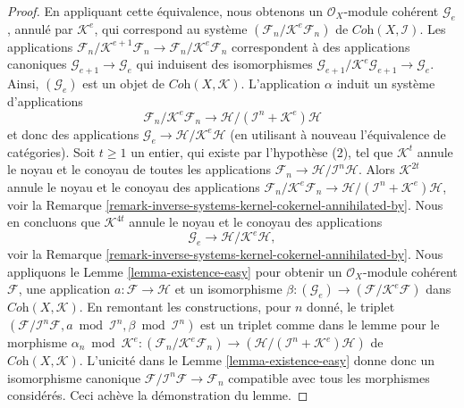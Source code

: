 \begin{proof}
\medskip\noindent
En appliquant cette équivalence, nous obtenons un
$\mathcal{O}_X$-module cohérent $\mathcal{G}_e$, annulé par
$\mathcal{K}^e$, qui correspond au système
$(\mathcal{F}_n/\mathcal{K}^e\mathcal{F}_n)$ de
$\textit{Coh}(X, \mathcal{I})$. Les applications
$\mathcal{F}_n/\mathcal{K}^{e + 1}\mathcal{F}_n \to
\mathcal{F}_n/\mathcal{K}^e\mathcal{F}_n$ correspondent à des applications
canoniques $\mathcal{G}_{e + 1} \to \mathcal{G}_e$ qui induisent des
isomorphismes
$\mathcal{G}_{e + 1}/\mathcal{K}^e\mathcal{G}_{e + 1} \to \mathcal{G}_e$.
Ainsi, $(\mathcal{G}_e)$ est un objet de $\textit{Coh}(X, \mathcal{K})$.
L'application $\alpha$ induit un système d'applications
$$
\mathcal{F}_n/\mathcal{K}^e\mathcal{F}_n
\longrightarrow
\mathcal{H}/(\mathcal{I}^n + \mathcal{K}^e)\mathcal{H}
$$
et donc des applications
$\mathcal{G}_e \to \mathcal{H}/\mathcal{K}^e\mathcal{H}$
(en utilisant à nouveau l'équivalence de catégories).
Soit $t \geq 1$ un entier, qui existe par l'hypothèse (2), tel que
$\mathcal{K}^t$ annule le noyau et le conoyau de toutes les applications
$\mathcal{F}_n \to \mathcal{H}/\mathcal{I}^n\mathcal{H}$.
Alors $\mathcal{K}^{2t}$ annule le noyau et le conoyau des applications
$\mathcal{F}_n/\mathcal{K}^e\mathcal{F}_n \to
\mathcal{H}/(\mathcal{I}^n + \mathcal{K}^e)\mathcal{H}$, voir la
Remarque \ref{remark-inverse-systems-kernel-cokernel-annihilated-by}.
Nous en concluons que $\mathcal{K}^{4t}$ annule le noyau et
le conoyau des applications
$$
\mathcal{G}_e
\longrightarrow
\mathcal{H}/\mathcal{K}^e\mathcal{H},
$$
voir la Remarque \ref{remark-inverse-systems-kernel-cokernel-annihilated-by}.
Nous appliquons le Lemme \ref{lemma-existence-easy} pour obtenir un
$\mathcal{O}_X$-module cohérent $\mathcal{F}$, une application
$a : \mathcal{F} \to \mathcal{H}$ et un isomorphisme
$\beta : (\mathcal{G}_e) \to (\mathcal{F}/\mathcal{K}^e\mathcal{F})$
dans $\textit{Coh}(X, \mathcal{K})$. En remontant les constructions, pour
$n$ donné, le triplet
$(\mathcal{F}/\mathcal{I}^n\mathcal{F}, a \bmod \mathcal{I}^n, \beta
\bmod \mathcal{I}^n)$ est un triplet comme dans le lemme pour le morphisme
$\alpha_n \bmod \mathcal{K}^e :
(\mathcal{F}_n/\mathcal{K}^e\mathcal{F}_n) \to
(\mathcal{H}/(\mathcal{I}^n + \mathcal{K}^e)\mathcal{H})$
de $\textit{Coh}(X, \mathcal{K})$. L'unicité dans le
Lemme \ref{lemma-existence-easy}
donne donc un isomorphisme canonique
$\mathcal{F}/\mathcal{I}^n\mathcal{F} \to \mathcal{F}_n$
compatible avec tous les morphismes considérés. Ceci achève la démonstration
du lemme.
\end{proof}

